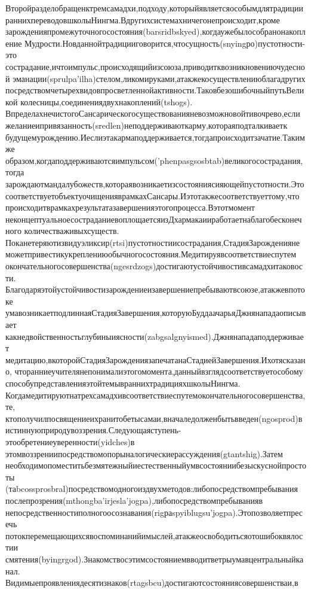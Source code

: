{Второйразделобращенктремсамадхи,подходу,которыйявляетсяособымдлятрадиции
раннихпереводовшколыНингма.Вдругихсистемахничегонепроисходит,кроме
зарожденияпромежуточногосостояния(barsridbskyed),когдаужебылособранонакопление
Мудрости.Новданнойтрадицииговорится,чтосущность(snyingро)пустотности-это
сострадание,ичтоимпульс,происходящийизсоюза,приводитквозникновениючудесной
эманации(sprulpa'ilha)стелом,ликомируками,атакжекосуществлениюблагадругих
посредствомчетырехвидовпросветленнойактивности.ТаковбезошибочныйпутьВеликой
колесницы,соединениядвухнакоплений(tshogs).
ВпределахнечистогоСансарическогосуществованияневозможновойтивочрево,если
желаниеипривязанность(sredlen)неподдерживаюткарму,котораяподталкиваетк
будущемурождению.Иеслиэтакармаподдерживается,тогдапроисходитзачатие.Такимже
образом,когдаподдерживаютсяимпульсом('phenpasgsosbtab)великогосострадания,тогда
зарождаютмандалубожеств,котораявозникаетизсостояниясияющейпустотности.Это
соответствуетобъектуочищенияврамкахСансары.Иэтотакжесоответствуеттому,что
происходитврамкахрезультатазавершенияэтогопроцесса.Вэтотмомент
неконцептуальноесостраданиевоплощаетсяизДхармакаииработаетнаблагобесконечного
количестваживыхсуществ.
Поканетеряютизвидуэликсир(rtsi)пустотностиисострадания,СтадияЗарожденияне
можетпривестикукреплениюобычногосостояния.Медитируявсоответствиеспутем
окончательногосовершенства(ngesrdzogs)достигаютустойчивостивсамадхитаковости.
Благодаряэтойустойчивостизарождениеизавершениепребываютвсоюзе,атакжевпотоке
умавозникаетподлиннаяСтадияЗавершения,которуюБуддаачарьяДжнянападаописывает
какнедвойственностьглубиныиясности(zabgsalgnyismed).Джнянападаподдерживает
медитацию,вкоторойСтадияЗарождениязапечатанаСтадиейЗавершения.Ихотясказано,
чторанниеучителянепонималиэтогомомента,данныйвзглядсоответствуетособому
способупредставленияэтойтемывраннихтрадицияхшколыНингма.
Когдамедитируютнатрехсамадхивсоответствиеспутемокончательногосовершенства,те,
ктополучилпосвящениеихранитобетысамаи,вначаледолженбытьвведен(ngosprod)в
истиннуюприродувоззрения.Следующаяступень-этообретениеуверенности(yidches)в
этомвоззрениипосредствомопорыналогическиерассуждения(gtantshig).Затем
необходимопоместитьбезмятежныйиестественныйумвсостояниибезыскуснойпростоты
(таbcossprosbral)посредствомодногоиздвухметодов:либопосредствомпребывания
послепрозрения(mthongba'irjesla'jogpa),либопосредствомпребыванияв
непосредственностиполногоосознавания(rigраspyiblugsu'jogpa).Этопозволяетпресечь
потокперемещающихсявоспоминанийимыслей,атакжеосвободитьсяотошибоквялостии
смятения(byingrgod).Знакомствосэтимсостояниемвводитветрыумавцентральныйканал.
Видимыепроявлениядесятизнаков(rtagsbcu)достигаютсостояниясовершенстваи,в
}
